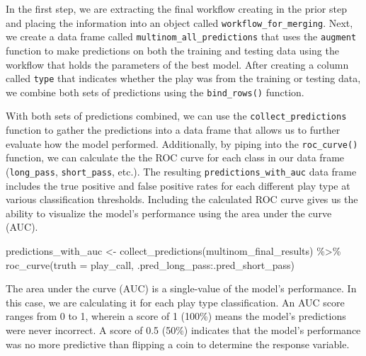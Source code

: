 \documentclass[
  letterpaper,
]{krantz}
\newenvironment{Shaded}{\begin{snugshade}}{\end{snugshade}}
\newcommand{\AttributeTok}[1]{\textcolor[rgb]{0.40,0.45,0.13}{#1}}
\newcommand{\FunctionTok}[1]{\textcolor[rgb]{0.28,0.35,0.67}{#1}}
\newcommand{\NormalTok}[1]{\textcolor[rgb]{0.00,0.23,0.31}{#1}}
\newcommand{\OtherTok}[1]{\textcolor[rgb]{0.00,0.23,0.31}{#1}}
\newcommand{\SpecialCharTok}[1]{\textcolor[rgb]{0.37,0.37,0.37}{#1}}
\begin{document}
In the first step, we are extracting the final workflow creating in the
prior step and placing the information into an object called
\texttt{workflow\_for\_merging}. Next, we create a data frame called
\texttt{multinom\_all\_predictions} that uses the \texttt{augment}
function to make predictions on both the training and testing data using
the workflow that holds the parameters of the best model. After creating
a column called \texttt{type} that indicates whether the play was from
the training or testing data, we combine both sets of predictions using
the \texttt{bind\_rows()} function.

With both sets of predictions combined, we can use the
\texttt{collect\_predictions} function to gather the predictions into a
data frame that allows us to further evaluate how the model performed.
Additionally, by piping into the \texttt{roc\_curve()} function, we can
calculate the the ROC curve for each class in our data frame
(\texttt{long\_pass}, \texttt{short\_pass}, etc.). The resulting
\texttt{predictions\_with\_auc} data frame includes the true positive
and false positive rates for each different play type at various
classification thresholds. Including the calculated ROC curve gives us
the ability to visualize the model's performance using the area under
the curve (AUC).

\begin{Shaded}
\begin{Highlighting}[]
\NormalTok{predictions\_with\_auc }\OtherTok{\textless{}{-}} \FunctionTok{collect\_predictions}\NormalTok{(multinom\_final\_results) }\SpecialCharTok{\%\textgreater{}\%}
  \FunctionTok{roc\_curve}\NormalTok{(}\AttributeTok{truth =}\NormalTok{ play\_call, .pred\_long\_pass}\SpecialCharTok{:}\NormalTok{.pred\_short\_pass)}
\end{Highlighting}
\end{Shaded}

\begin{tcolorbox}[enhanced jigsaw, colback=white, leftrule=.75mm, breakable, colframe=quarto-callout-important-color-frame, bottomtitle=1mm, rightrule=.15mm, left=2mm, opacityback=0, bottomrule=.15mm, arc=.35mm, coltitle=black, colbacktitle=quarto-callout-important-color!10!white, toptitle=1mm, titlerule=0mm, title=\textcolor{quarto-callout-important-color}{\faExclamation}\hspace{0.5em}{Important}, toprule=.15mm, opacitybacktitle=0.6]

The area under the curve (AUC) is a single-value of the model's
performance. In this case, we are calculating it for each play type
classification. An AUC score ranges from 0 to 1, wherein a score of 1
(100\%) means the model's predictions were never incorrect. A score of
0.5 (50\%) indicates that the model's performance was no more predictive
than flipping a coin to determine the response variable.

\end{tcolorbox}
\end{document}

